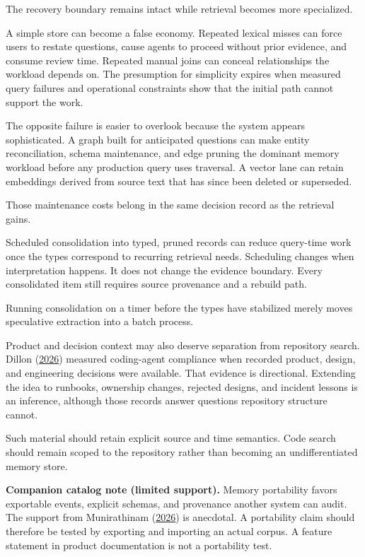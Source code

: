 The recovery boundary remains intact while retrieval becomes more specialized.

A simple store can become a false economy. Repeated lexical misses can force users to restate questions, cause agents to proceed without prior evidence, and consume review time. Repeated manual joins can conceal relationships the workload depends on. The presumption for simplicity expires when measured query failures and operational constraints show that the initial path cannot support the work.

The opposite failure is easier to overlook because the system appears sophisticated. A graph built for anticipated questions can make entity reconciliation, schema maintenance, and edge pruning the dominant memory workload before any production query uses traversal. A vector lane can retain embeddings derived from source text that has since been deleted or superseded.

Those maintenance costs belong in the same decision record as the retrieval gains.

Scheduled consolidation into typed, pruned records can reduce query-time work once the types correspond to recurring retrieval needs. Scheduling changes when interpretation happens. It does not change the evidence boundary. Every consolidated item still requires source provenance and a rebuild path.

Running consolidation on a timer before the types have stabilized merely moves speculative extraction into a batch process.

Product and decision context may also deserve separation from repository search. Dillon (\href{https://arxiv.org/abs/2605.08112}{2026}) measured coding-agent compliance when recorded product, design, and engineering decisions were available. That evidence is directional. Extending the idea to runbooks, ownership changes, rejected designs, and incident lessons is an inference, although those records answer questions repository structure cannot.

Such material should retain explicit source and time semantics. Code search should remain scoped to the repository rather than becoming an undifferentiated memory store.

\textbf{Companion catalog note (limited support).} Memory portability favors exportable events, explicit schemas, and provenance another system can audit. The support from Munirathinam (\href{https://arxiv.org/abs/2606.01138}{2026}) is anecdotal. A portability claim should therefore be tested by exporting and importing an actual corpus. A feature statement in product documentation is not a portability test.


